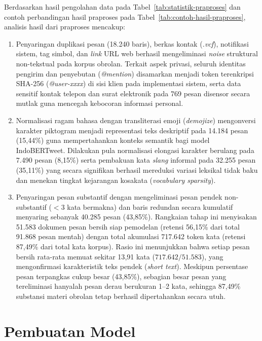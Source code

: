 Berdasarkan hasil pengolahan data pada Tabel~\ref{tab:statistik-praproses} dan contoh perbandingan hasil praproses pada Tabel~\ref{tab:contoh-hasil-praproses}, analisis hasil dari praproses mencakup:
\begin{enumerate}[label=\alph*., leftmargin=*, itemsep=2pt]
	\item Penyaringan duplikasi pesan (18.240 baris), berkas kontak (\textit{.vcf}), notifikasi sistem, tag simbol, dan \textit{link} URL web berhasil mengeliminasi \textit{noise} struktural non-tekstual pada korpus obrolan. Terkait aspek privasi, seluruh identitas pengirim dan penyebutan (\textit{@mention}) disamarkan menjadi token terenkripsi SHA-256 (\textit{@user-xxxx}) di sisi klien pada implementasi sistem, serta data sensitif kontak telepon dan surat elektronik pada 769 pesan disensor secara mutlak guna mencegah kebocoran informasi personal.
	\item Normalisasi ragam bahasa dengan transliterasi emoji (\textit{demojize}) mengonversi karakter piktogram menjadi representasi teks deskriptif pada 14.184 pesan (15,44\%) guna mempertahankan konteks semantik bagi model IndoBERTweet. Dilakukan pula normalisasi elongasi karakter berulang pada 7.490 pesan (8,15\%) serta pembakuan kata \textit{slang} informal pada 32.255 pesan (35,11\%) yang secara signifikan berhasil mereduksi variasi leksikal tidak baku dan menekan tingkat kejarangan kosakata (\textit{vocabulary sparsity}).
	\item Penyaringan pesan substantif dengan mengeliminasi pesan pendek non-substantif ($< 3$ kata bermakna) dan baris redundan secara kumulatif menyaring sebanyak 40.285 pesan (43,85\%). Rangkaian tahap ini menyisakan 51.583 dokumen pesan bersih siap pemodelan (retensi 56,15\% dari total 91.868 pesan mentah) dengan total akumulasi 717.642 token kata (retensi 87,49\% dari total kata korpus). Rasio ini menunjukkan bahwa setiap pesan bersih rata-rata memuat sekitar 13{,}91 kata ($717.642 / 51.583$), yang mengonfirmasi karakteristik teks pendek (\textit{short text}). Meskipun persentase pesan terpangkas cukup besar (43,85\%), sebagian besar pesan yang tereliminasi hanyalah pesan derau berukuran 1--2 kata, sehingga 87,49\% substansi materi obrolan tetap berhasil dipertahankan secara utuh.
\end{enumerate}

\section{Pembuatan Model}
\label{sec:model-creation-results}

